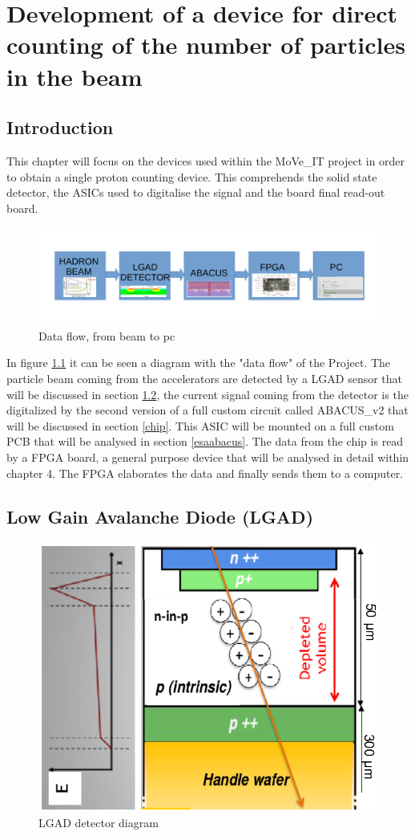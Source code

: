 \chapter{Development of a device for direct counting of the number of particles in the beam}

\section{Introduction}
This chapter will focus on the devices used within the MoVe\_IT project in order to obtain a single proton counting device.
This comprehends the solid state detector, the ASICs used to digitalise the signal and the board final read-out board.
\begin{figure}[H]
	\centering
	\includegraphics[width=0.99\linewidth]{IMG/ch2/BLOCK}
	\caption{Data flow, from beam to pc}
	\label{fig:block}
\end{figure}
\noindent In figure \ref{fig:block} it can be seen a diagram with the "data flow" of the Project.
The particle beam coming from the accelerators are detected by a LGAD sensor that will be discussed in section \ref{lgad}, the current signal coming from the detector is the digitalized by the second version of a full custom circuit called ABACUS\_v2 that will be discussed in section \ref{chip}.
This ASIC will be mounted on a full custom PCB that will be analysed in section \ref{esaabacus}.
The data from the chip is read by a FPGA board, a general purpose device that will be analysed in detail within chapter 4.
The FPGA elaborates the data and finally sends them to a computer.  

\section{Low Gain Avalanche Diode (LGAD)}\label{lgad}
\cite{lgad}
\begin{figure}[H]
	\centering
	\includegraphics[width=0.35\linewidth]{IMG/ch2/UFSDLGAD.png}
	\caption{LGAD detector diagram}
	\label{fig:ufsdlgad}
\end{figure}


